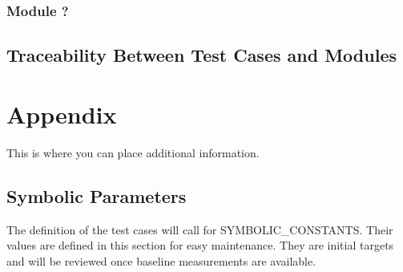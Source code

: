 \documentclass[12pt, titlepage]{article}
\begin{document}

					
					
					
					


\subsubsection{Module ?}


\subsection{Traceability Between Test Cases and Modules}

				




\newpage

\section{Appendix}

This is where you can place additional information.

\subsection{Symbolic Parameters}

The definition of the test cases will call for SYMBOLIC\_CONSTANTS.
Their values are defined in this section for easy maintenance. They are initial
targets and will be reviewed once baseline measurements are available.
\end{document}
